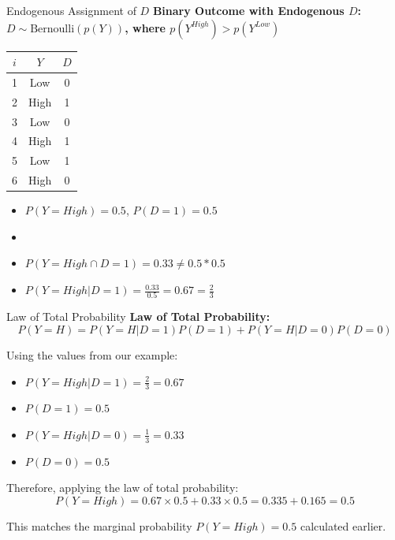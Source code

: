 \documentclass[xcolor=svgnames,t]{beamer}
\begin{document}
\begin{frame}{Endogenous Assignment of \( D \)}
    \textbf{Binary Outcome with Endogenous \( D \): \( D \sim \text{Bernoulli}(p(Y)) \), where \( p(Y^{High}) > p(Y^{Low}) \)}
    
    \centering
    \begin{table}[]
    \begin{tabular}{|c|c|c|}
    \hline
    \( i \) & \( Y \) & \( D \) \\ \hline
    1 & Low  & 0 \\ \hline
    \rowcolor{blue!20} 2 & High & 1 \\ \hline
    3 & Low  & 0 \\ \hline
    \rowcolor{blue!20} 4 & High & 1 \\ \hline
    5 & Low  & 1 \\ \hline
    6 & High & 0 \\ \hline
    \end{tabular}
    \end{table}

    \small{
    \begin{itemize}
      \item \( P(Y = High) = 0.5 \), \( P(D = 1) = 0.5 \)
      \item \item \( P(Y = High \cap D = 1) = 0.33 \neq 0.5 *0.5  \)
      \item \( P(Y = High | D = 1) = \frac{0.33}{0.5} = 0.67 = \frac{2}{3}\)
      
    \end{itemize}
    }
\end{frame}

\begin{frame}{Law of Total Probability}
    \textbf{Law of Total Probability:}
    \[
    P(Y = H) = P(Y = H | D = 1)P(D = 1) + P(Y = H | D = 0)P(D = 0)
    \]
    
    \vspace{0.5cm}
    Using the values from our example:
    \begin{itemize}
        \item \( P(Y = High | D = 1) = \frac{2}{3} = 0.67 \)
        \item \( P(D = 1) = 0.5 \)
        \item \( P(Y = High | D = 0) = \frac{1}{3} = 0.33 \)
        \item \( P(D = 0) = 0.5 \)
    \end{itemize}
    
    \vspace{0.5cm}
    Therefore, applying the law of total probability:
    \[
    P(Y = High) = 0.67 \times 0.5 + 0.33 \times 0.5 = 0.335 + 0.165 = 0.5
    \]
    
    \vspace{0.5cm}
    This matches the marginal probability \( P(Y = High) = 0.5 \) calculated earlier.
\end{frame}
\end{document}
